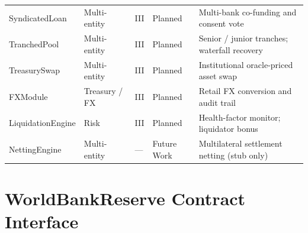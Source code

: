 \documentclass[12pt,a4paper]{report}
\begin{document}
\begin{table}[H]
\begin{tabular}{@{}>{\raggedright\arraybackslash}p{2.4cm}>{\raggedright\arraybackslash}p{1.6cm}>{\centering\arraybackslash}p{0.9cm}>{\raggedright\arraybackslash}p{1.5cm}>{\raggedright\arraybackslash}p{6.2cm}@{}}
SyndicatedLoan & Multi-entity & III & Planned & Multi-bank co-funding and consent vote \\
TranchedPool & Multi-entity & III & Planned & Senior / junior tranches; waterfall recovery \\
\rowcolor{RowShade}
TreasurySwap & Multi-entity & III & Planned & Institutional oracle-priced asset swap \\
FXModule & Treasury / FX & III & Planned & Retail FX conversion and audit trail \\
\rowcolor{RowShade}
LiquidationEngine & Risk & III & Planned & Health-factor monitor; liquidator bonus \\
NettingEngine & Multi-entity & --- & Future Work & Multilateral settlement netting (stub only) \\
\bottomrule
\end{tabular}
\end{table}


\section{WorldBankReserve Contract Interface}
\label{app:worldbank-reserve-interface}

\end{document}
